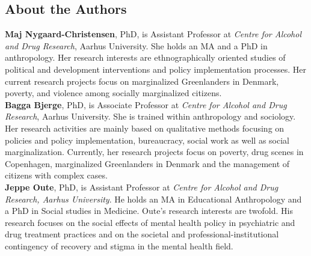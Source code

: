 \subsection{About the Authors}
\label{paper2:colophon}

\textbf{Maj Nygaard-Christensen}, PhD, is Assistant Professor at \textit{Centre for Alcohol and Drug Research}, Aarhus University. She holds an MA and a PhD in anthropology. Her research interests are ethnographically oriented studies  of political and development interventions and policy implementation processes. Her current research projects focus on marginalized Greenlanders in Denmark, poverty, and violence among socially marginalized citizens.
\\
\textbf{Bagga Bjerge}, PhD, is Associate Professor at \textit{Centre for Alcohol and Drug Research}, Aarhus University. She is trained within anthropology and sociology. Her research activities are mainly based on qualitative methods focusing on policies and policy implementation, bureaucracy, social work as well as social marginalization. Currently, her research projects focus on poverty, drug scenes in Copenhagen, marginalized Greenlanders in Denmark and the management of citizens with complex cases.
\\
\textbf{Jeppe Oute}, PhD, is Assistant Professor at \textit{Centre for Alcohol and Drug Research, Aarhus University}. He holds an MA in Educational Anthropology and a PhD in Social studies in Medicine. Oute’s research interests are twofold. His research focuses on the social effects of mental health policy in psychiatric and drug treatment practices and on the societal and professional-institutional contingency of recovery and stigma in the mental health field.